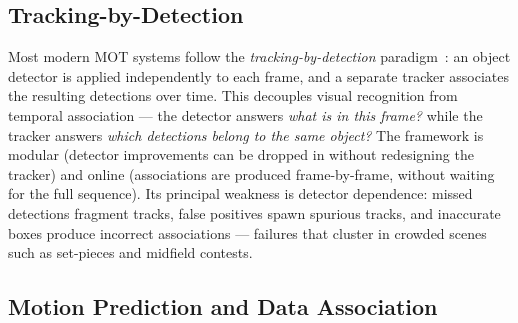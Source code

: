 \subsection{Tracking-by-Detection}
\label{subsec:background_tracking_by_detection}

Most modern MOT systems follow the 
\emph{tracking-by-detection} paradigm~\cite{Bewley2016SORT}: 
an object detector is applied independently to each frame, 
and a separate tracker associates the resulting detections 
over time. This decouples visual recognition from temporal 
association — the detector answers \emph{what is in this 
frame?} while the tracker answers \emph{which detections 
belong to the same object?} The framework is modular 
(detector improvements can be dropped in without redesigning 
the tracker) and online (associations are produced 
frame-by-frame, without waiting for the full sequence). Its 
principal weakness is detector dependence: missed detections 
fragment tracks, false positives spawn spurious tracks, and 
inaccurate boxes produce incorrect associations — failures 
that cluster in crowded scenes such as set-pieces and 
midfield contests.

\subsection{Motion Prediction and Data Association}
\label{subsec:background_motion_association}

